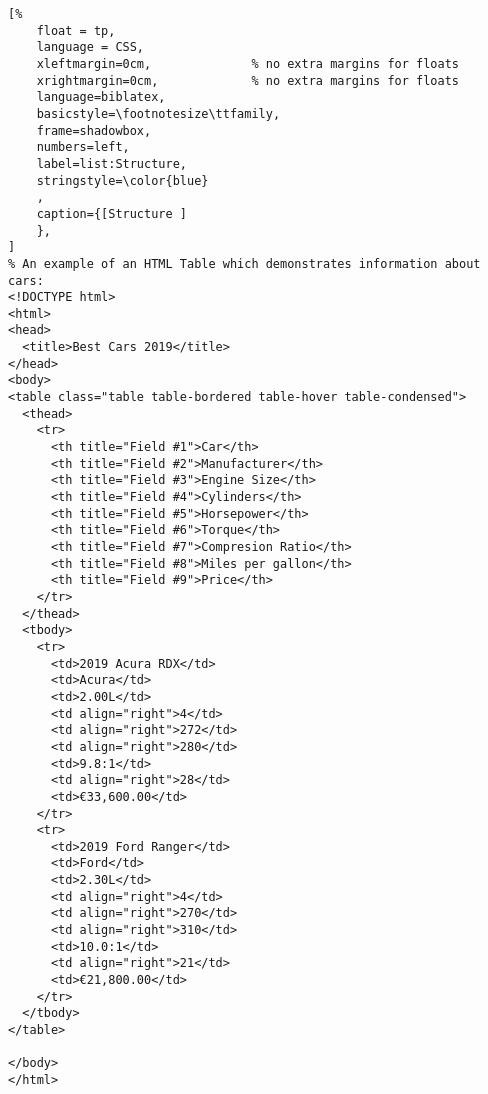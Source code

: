 \begin{lstlisting}[%
    float = tp,
    language = CSS,
    xleftmargin=0cm,              % no extra margins for floats
    xrightmargin=0cm,             % no extra margins for floats
    language=biblatex,
    basicstyle=\footnotesize\ttfamily,
    frame=shadowbox,
    numbers=left,
    label=list:Structure,
    stringstyle=\color{blue}
    ,
    caption={[Structure ]
    },
]
% An example of an HTML Table which demonstrates information about cars:
<!DOCTYPE html>
<html>
<head>
  <title>Best Cars 2019</title>
</head>
<body>
<table class="table table-bordered table-hover table-condensed">
  <thead>
    <tr>
      <th title="Field #1">Car</th>
      <th title="Field #2">Manufacturer</th>
      <th title="Field #3">Engine Size</th>
      <th title="Field #4">Cylinders</th>
      <th title="Field #5">Horsepower</th>
      <th title="Field #6">Torque</th>
      <th title="Field #7">Compresion Ratio</th>
      <th title="Field #8">Miles per gallon</th>
      <th title="Field #9">Price</th>
    </tr>
  </thead>
  <tbody>
    <tr>
      <td>2019 Acura RDX</td>
      <td>Acura</td>
      <td>2.00L</td>
      <td align="right">4</td>
      <td align="right">272</td>
      <td align="right">280</td>
      <td>9.8:1</td>
      <td align="right">28</td>
      <td>€33,600.00</td>
    </tr>
    <tr>
      <td>2019 Ford Ranger</td>
      <td>Ford</td>
      <td>2.30L</td>
      <td align="right">4</td>
      <td align="right">270</td>
      <td align="right">310</td>
      <td>10.0:1</td>
      <td align="right">21</td>
      <td>€21,800.00</td>
    </tr>
  </tbody>
</table>

</body>
</html>

\end{lstlisting}

